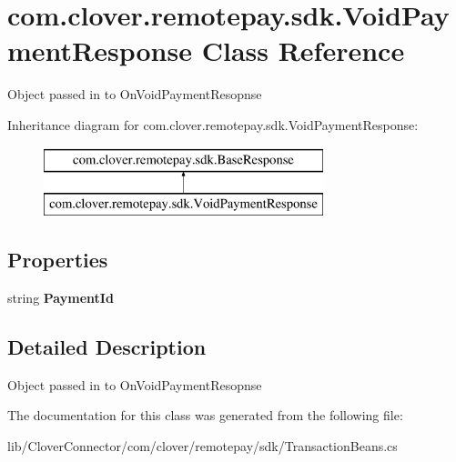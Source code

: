 \hypertarget{classcom_1_1clover_1_1remotepay_1_1sdk_1_1_void_payment_response}{}\section{com.\+clover.\+remotepay.\+sdk.\+Void\+Payment\+Response Class Reference}
\label{classcom_1_1clover_1_1remotepay_1_1sdk_1_1_void_payment_response}


Object passed in to On\+Void\+Payment\+Resopnse  


Inheritance diagram for com.\+clover.\+remotepay.\+sdk.\+Void\+Payment\+Response\+:\begin{figure}[H]
\begin{center}
\leavevmode
\includegraphics[height=2.000000cm]{classcom_1_1clover_1_1remotepay_1_1sdk_1_1_void_payment_response}
\end{center}
\end{figure}
\subsection*{Properties}
\begin{DoxyCompactItemize}
\item 
\mbox{\label{classcom_1_1clover_1_1remotepay_1_1sdk_1_1_void_payment_response_a952690e3d72ac4e86f3097900e48f80a}} 
string {\bfseries Payment\+Id}
\end{DoxyCompactItemize}


\subsection{Detailed Description}
Object passed in to On\+Void\+Payment\+Resopnse 



The documentation for this class was generated from the following file\+:\begin{DoxyCompactItemize}
\item 
lib/\+Clover\+Connector/com/clover/remotepay/sdk/Transaction\+Beans.\+cs\end{DoxyCompactItemize}

